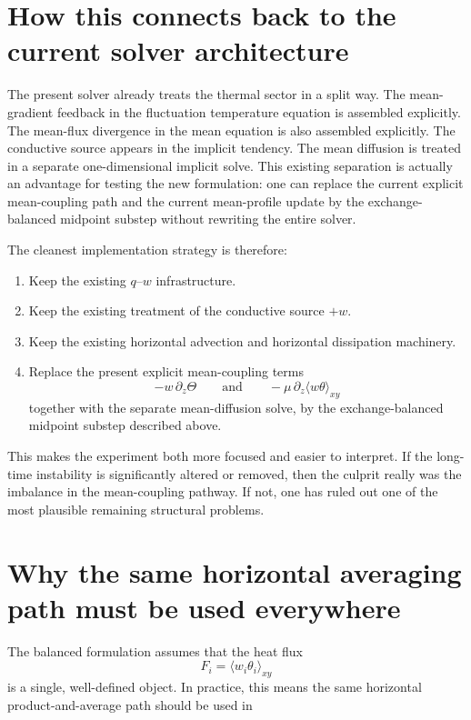 \documentclass[11pt]{article}
\begin{document}
\section{How this connects back to the current solver architecture}

The present solver already treats the thermal sector in a split way. The mean-gradient feedback in the fluctuation temperature equation is assembled explicitly. The mean-flux divergence in the mean equation is also assembled explicitly. The conductive source appears in the implicit tendency. The mean diffusion is treated in a separate one-dimensional implicit solve. This existing separation is actually an advantage for testing the new formulation: one can replace the current explicit mean-coupling path and the current mean-profile update by the exchange-balanced midpoint substep without rewriting the entire solver.

The cleanest implementation strategy is therefore:

\begin{enumerate}[label=\arabic*.]
\item Keep the existing $q$--$w$ infrastructure.
\item Keep the existing treatment of the conductive source $+w$.
\item Keep the existing horizontal advection and horizontal dissipation machinery.
\item Replace the present explicit mean-coupling terms
\[
-w\,\partial_z\Theta
\qquad\text{and}\qquad
-\mu\,\partial_z\langle w\theta\rangle_{xy}
\]
together with the separate mean-diffusion solve, by the exchange-balanced midpoint substep described above.
\end{enumerate}

This makes the experiment both more focused and easier to interpret. If the long-time instability is significantly altered or removed, then the culprit really was the imbalance in the mean-coupling pathway. If not, one has ruled out one of the most plausible remaining structural problems.

\section{Why the same horizontal averaging path must be used everywhere}

The balanced formulation assumes that the heat flux
\[
F_i = \langle w_i\theta_i\rangle_{xy}
\]
is a single, well-defined object. In practice, this means the same horizontal product-and-average path should be used in
\end{document}
